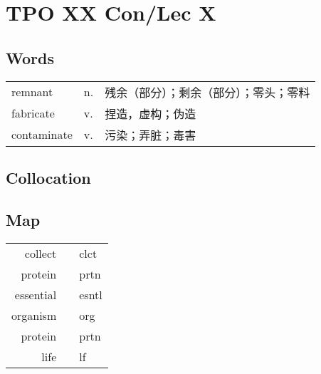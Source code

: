 \section{TPO XX Con/Lec X}

\subsection{Words}

\begin{tabular}{lll}
    remnant     & n. & 残余（部分）；剩余（部分）；零头；零料 \\
    fabricate   & v. & 捏造，虚构；伪造            \\
    contaminate & v. & 污染；弄脏；毒害            \\
\end{tabular}

\subsection{Collocation}

\subsection{Map}

\begin{tabular}{rc@{\quad$\to$\quad}l}
    collect   &  & clct  \\
    protein   &  & prtn  \\
    essential &  & esntl \\
    organism  &  & org   \\
    protein   &  & prtn  \\
    life      &  & lf    \\
\end{tabular}
